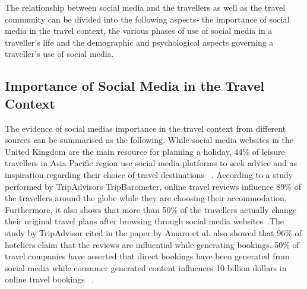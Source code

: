 The relationship between social media and the travellers as well as the travel community can be divided into the following aspects- the importance of social media in the travel context, the various phases of use of social media in a traveller's life and the demographic and psychological aspects governing a traveller's use of social media.

\subsection{Importance of Social Media in the Travel Context}\label{2.1}

The evidence of social media\textquotesingle s importance in the travel context from different sources can be summarised as the following. While social media websites in the United Kingdom are the main resource for planning a holiday, 44\% of leisure travellers in Asia Pacific region use social media platforms to seek advice and as inspiration regarding their choice of travel destinations ~\cite{amaro2016travelers}. According to a study performed by TripAdvisor\textquotesingle s TripBarometer, online travel reviews influence 89\% of the travellers around the globe while they are choosing their accommodation. Furthermore, it also shows that more than 50\% of the travellers actually change their original travel plans after browsing through social media websites~\cite{amaro2016travelers}.The study by TripAdvisor cited in the paper by Amaro et al. also showed that 96\% of hoteliers claim that the reviews are influential while generating bookings. 50\% of travel companies have asserted that direct bookings have been generated from social media while consumer generated content influences 10 billion dollars in online travel bookings ~\cite{amaro2016travelers}.

